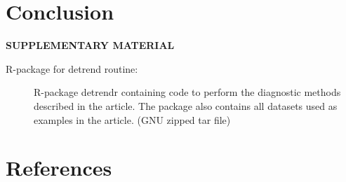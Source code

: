\documentclass[12pt]{article}
\begin{document}
		
	

	\section{Conclusion}
	\label{sec:conc}
	
	
	\bigskip
	\begin{center}
		{\large\bf SUPPLEMENTARY MATERIAL}
	\end{center}
	
	\begin{description}
		
		\item[R-package for detrend routine:] R-package detrendr containing code to perform the diagnostic methods described in the article. The package also contains all datasets used as examples in the article. (GNU zipped tar file)
				
	\end{description}
	
	\section{References}

	
	
	
	
\end{document}
